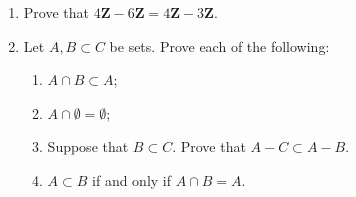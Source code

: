 \documentclass[12pt, reqno]{amsart}
\begin{document}
\begin{enumerate}
\vspace{10pt}

\item Prove that $4\mathbf{Z} - 6\mathbf{Z} = 4\mathbf{Z} - 3\mathbf{Z}$.
\vspace{10pt}

\item Let $A,B \subset C$ be sets. Prove each of the following:
 \begin{enumerate}
 \item $A \cap B \subset A$;
 \item $A \cap \emptyset = \emptyset$;
 \item Suppose that $B \subset C$. Prove that $A-C \subset A-B$.
 \item $A \subset B$ if and only if $A \cap B = A$.
 \end{enumerate}

\end{enumerate}
\end{document}
